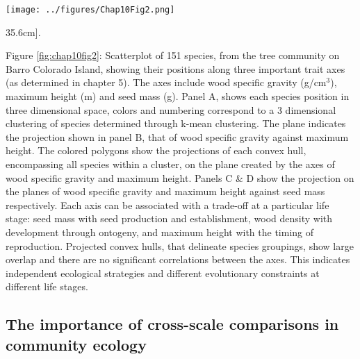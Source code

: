 \documentclass[b5paper,justified]{tufte-book} %
\begin{document}
\begin{fullwidth}
\begin{figure*}
\hspace*{-.1cm} \texttt{[image: ../figures/Chap10Fig2.png]}
\caption[Positions along three important trait axes for 151 species][35.6cm]{.}
\label{fig:chap10fig2}
\footnotesize
\hspace*{.1cm} \begin{minipage}{14cm}
\vspace*{.4cm}
Figure \ref{fig:chap10fig2}: 
Scatterplot of 151 species, from the tree community on Barro Colorado Island, showing their positions along three important trait axes (as determined in chapter 5). The axes include wood specific gravity (g/cm$^3$), maximum height (m) and seed mass (g). Panel A, shows each species position in three dimensional space, colors and numbering correspond to a 3 dimensional clustering of species determined through k-mean clustering.  The plane indicates the projection shown in panel B, that of wood specific gravity against maximum height. The colored polygons show the projections of each convex hull, encompassing all species within a cluster, on the plane created by the axes of wood specific gravity and maximum height. Panels C \& D show the projection on the planes of wood specific gravity and maximum height against seed mass respectively. Each axis can be associated with a trade-off at a particular life stage: seed mass with seed production and establishment, wood density with development through ontogeny, and maximum height with the timing of reproduction. Projected convex hulls, that delineate species groupings, show large overlap and there are no significant correlations between the axes. This indicates independent ecological strategies and different evolutionary constraints at different life stages.
\end{minipage}
\end{figure*}


\subsection{The importance of cross-scale comparisons in community ecology}
\end{fullwidth}
\end{document}
